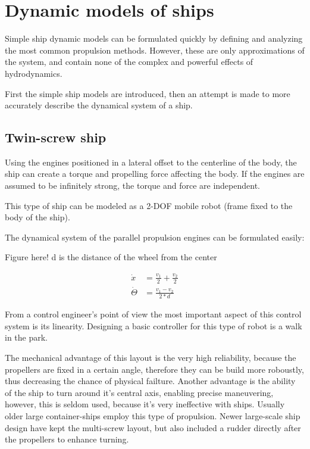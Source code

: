\section{Dynamic models of ships}

Simple ship dynamic models can be formulated quickly by defining and analyzing the most common propulsion methods. However, these are only approximations of the system, and contain none of the complex and powerful effects of hydrodynamics.

First the simple ship models are introduced, then an attempt is made to more accurately describe the dynamical system of a ship.

\subsection{Twin-screw ship}

Using the engines positioned in a lateral offset to the centerline of the body, the ship can create a torque and propelling force affecting the body. If the engines are assumed to be infinitely strong, the torque and force are independent.

This type of ship can be modeled as a 2-DOF mobile robot (frame fixed to the body of the ship).

The dynamical system of the parallel propulsion engines can be formulated easily:


Figure here! d is the distance of the wheel from the center

\begin{align}
	\dot{x} &= \frac{v_1}{2} + \frac{v_2}{2} \\
    \dot{\Theta} &= \frac{v_1-v_2}{2*d}
\end{align}

From a control engineer’s point of view the most important aspect of this control system is its linearity. Designing a basic controller for this type of robot is a walk in the park.

The mechanical advantage of this layout is the very high reliability, because the propellers are fixed in a certain angle, therefore they can be build more roboustly, thus decreasing the chance of physical failture. Another advantage is the ability of the ship to turn around it’s central axis, enabling precise maneuvering, however, this is seldom used, because it’s very ineffective with ships.
Usually older large container-ships employ this type of propulsion. Newer large-scale ship design have kept the multi-screw layout, but also included a rudder directly after the propellers to enhance turning.


